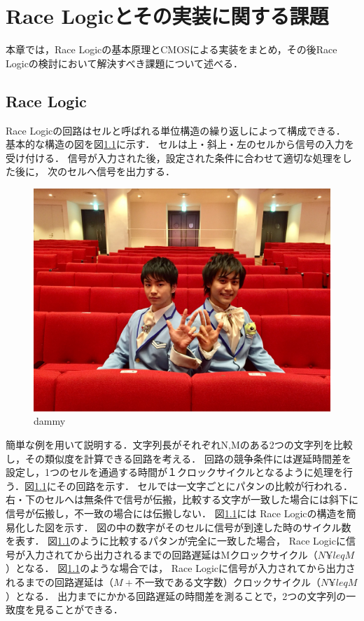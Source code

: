 \chapter{Race Logicとその実装に関する課題}
本章では，Race Logicの基本原理とCMOSによる実装をまとめ，その後Race Logicの検討において解決すべき課題について述べる．
\section{Race Logic}
Race Logicの回路はセルと呼ばれる単位構造の繰り返しによって構成できる．
基本的な構造の図を図\ref{dammy}に示す．
セルは上・斜上・左のセルから信号の入力を受け付ける．
信号が入力された後，設定された条件に合わせて適切な処理をした後に，
次のセルへ信号を出力する．
\begin{figure}[t!]
\begin{center}
\includegraphics[keepaspectratio,scale=0.01]{fig/dammy.jpg}
\caption{dammy}
\label{dammy}
\end{center}
\end{figure}

簡単な例を用いて説明する．文字列長がそれぞれN,Mのある2つの文字列を比較し，その類似度を計算できる回路を考える．
回路の競争条件には遅延時間差を設定し，1つのセルを通過する時間が１クロックサイクルとなるように処理を行う．図\ref{dammy}にその回路を示す．
セルでは一文字ごとにパタンの比較が行われる．
右・下のセルへは無条件で信号が伝搬，比較する文字が一致した場合には斜下に信号が伝搬し，不一致の場合には伝搬しない．
図\ref{dammy}には Race Logicの構造を簡易化した図を示す．
図の中の数字がそのセルに信号が到達した時のサイクル数を表す．
図\ref{dammy}のように比較するパタンが完全に一致した場合，
Race Logicに信号が入力されてから出力されるまでの回路遅延はMクロックサイクル（$N¥leqM$）となる．
図\ref{dammy}のような場合では，
Race Logicに信号が入力されてから出力されるまでの回路遅延は（$M+不一致である文字数$）クロックサイクル（$N¥leqM$）となる．
出力までにかかる回路遅延の時間差を測ることで，2つの文字列の一致度を見ることができる．

